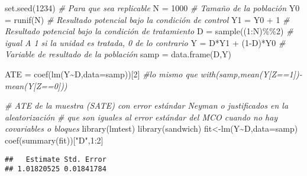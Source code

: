 \documentclass[
]{article}
\newenvironment{Shaded}{\begin{snugshade}}{\end{snugshade}}
\newcommand{\AttributeTok}[1]{\textcolor[rgb]{0.77,0.63,0.00}{#1}}
\newcommand{\CommentTok}[1]{\textcolor[rgb]{0.56,0.35,0.01}{\textit{#1}}}
\newcommand{\DecValTok}[1]{\textcolor[rgb]{0.00,0.00,0.81}{#1}}
\newcommand{\FunctionTok}[1]{\textcolor[rgb]{0.00,0.00,0.00}{#1}}
\newcommand{\NormalTok}[1]{#1}
\newcommand{\OtherTok}[1]{\textcolor[rgb]{0.56,0.35,0.01}{#1}}
\newcommand{\SpecialCharTok}[1]{\textcolor[rgb]{0.00,0.00,0.00}{#1}}
\newcommand{\StringTok}[1]{\textcolor[rgb]{0.31,0.60,0.02}{#1}}
\begin{document}
\begin{Shaded}
\begin{Highlighting}[]
\FunctionTok{set.seed}\NormalTok{(}\DecValTok{1234}\NormalTok{) }\CommentTok{\# Para que sea replicable }
\NormalTok{N }\OtherTok{=} \DecValTok{1000} \CommentTok{\# Tamaño de la población}
\NormalTok{Y0 }\OtherTok{=} \FunctionTok{runif}\NormalTok{(N) }\CommentTok{\# Resultado potencial bajo la condición de control}
\NormalTok{Y1 }\OtherTok{=}\NormalTok{ Y0 }\SpecialCharTok{+} \DecValTok{1} \CommentTok{\# Resultado potencial bajo la condición de tratamiento}
\NormalTok{D }\OtherTok{=} \FunctionTok{sample}\NormalTok{((}\DecValTok{1}\SpecialCharTok{:}\NormalTok{N)}\SpecialCharTok{\%\%}\DecValTok{2}\NormalTok{) }\CommentTok{\# igual A 1 si la unidad es tratada, 0 de lo contrario}
\NormalTok{Y }\OtherTok{=}\NormalTok{ D}\SpecialCharTok{*}\NormalTok{Y1 }\SpecialCharTok{+}\NormalTok{ (}\DecValTok{1}\SpecialCharTok{{-}}\NormalTok{D)}\SpecialCharTok{*}\NormalTok{Y0 }\CommentTok{\# Variable de resultado de la población}
\NormalTok{samp }\OtherTok{=} \FunctionTok{data.frame}\NormalTok{(D,Y) }

\NormalTok{ATE }\OtherTok{=} \FunctionTok{coef}\NormalTok{(}\FunctionTok{lm}\NormalTok{(Y}\SpecialCharTok{\textasciitilde{}}\NormalTok{D,}\AttributeTok{data=}\NormalTok{samp))[}\DecValTok{2}\NormalTok{] }\CommentTok{\#lo mismo que with(samp,mean(Y[Z==1]){-}mean(Y[Z==0])) }

\CommentTok{\# ATE de la muestra (SATE) con error estándar Neyman o justificados en la aleatorización}
\CommentTok{\# que son iguales al error estándar del MCO cuando no hay covariables o bloques}
\FunctionTok{library}\NormalTok{(lmtest) }
\FunctionTok{library}\NormalTok{(sandwich) }
\NormalTok{fit}\OtherTok{\textless{}{-}}\FunctionTok{lm}\NormalTok{(Y}\SpecialCharTok{\textasciitilde{}}\NormalTok{D,}\AttributeTok{data=}\NormalTok{samp) }
\FunctionTok{coef}\NormalTok{(}\FunctionTok{summary}\NormalTok{(fit))[}\StringTok{"D"}\NormalTok{,}\DecValTok{1}\SpecialCharTok{:}\DecValTok{2}\NormalTok{]}
\end{Highlighting}
\end{Shaded}

\begin{verbatim}
##   Estimate Std. Error 
## 1.01820525 0.01841784
\end{verbatim}
\end{document}
